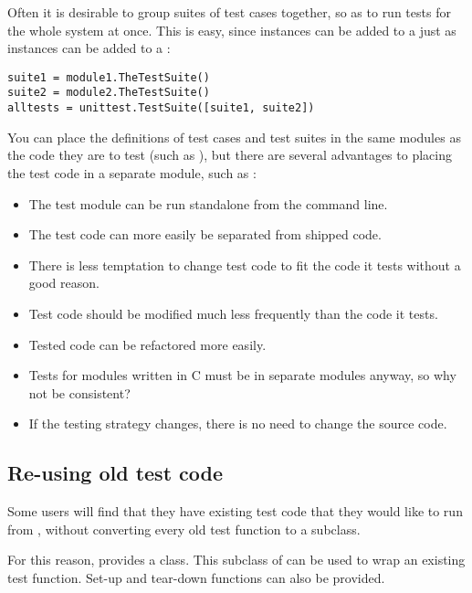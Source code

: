 Often it is desirable to group suites of test cases together, so as to
run tests for the whole system at once.  This is easy, since
 instances can be added to a  just
as  instances can be added to a :

\begin{verbatim}
suite1 = module1.TheTestSuite()
suite2 = module2.TheTestSuite()
alltests = unittest.TestSuite([suite1, suite2])
\end{verbatim}

You can place the definitions of test cases and test suites in the
same modules as the code they are to test (such as ),
but there are several advantages to placing the test code in a
separate module, such as :

\begin{itemize}
  \item The test module can be run standalone from the command line.
  \item The test code can more easily be separated from shipped code.
  \item There is less temptation to change test code to fit the code
        it tests without a good reason.
  \item Test code should be modified much less frequently than the
        code it tests.
  \item Tested code can be refactored more easily.
  \item Tests for modules written in C must be in separate modules
        anyway, so why not be consistent?
  \item If the testing strategy changes, there is no need to change
        the source code.
\end{itemize}


\subsection{Re-using old test code
            \label{legacy-unit-tests}}

Some users will find that they have existing test code that they would
like to run from , without converting every old test
function to a  subclass.

For this reason,  provides a 
class.  This subclass of  can be used to wrap an existing
test function.  Set-up and tear-down functions can also be provided.

